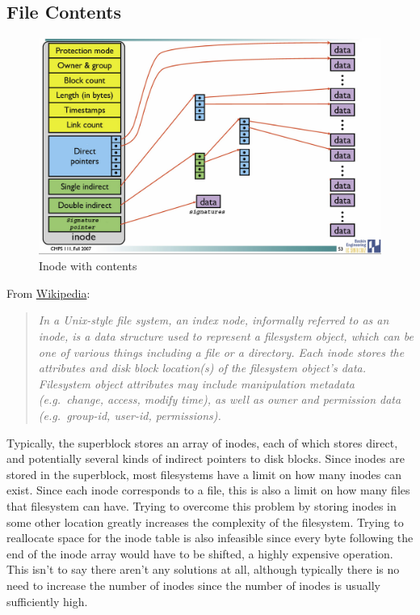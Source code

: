 \subsection{File Contents}

\begin{figure}[htbp]
\centering
\includegraphics[width=.8\textwidth]{filesystems/images/inode_with_signatures.jpg}
\caption{Inode with contents}
\end{figure}

From \href{http://en.wikipedia.org/wiki/Inode}{Wikipedia}:

\begin{quote}
\emph{In a Unix-style file system, an index node, informally referred to as an inode, is a data structure used to represent a filesystem object, which can be one of various things including a file or a directory. Each inode stores the attributes and disk block location(s) of the filesystem object's data. Filesystem object attributes may include manipulation metadata (e.g.~change, access, modify time), as well as owner and permission data (e.g.~group-id, user-id, permissions).}
\end{quote}

Typically, the superblock stores an array of inodes, each of which stores direct, and potentially several kinds of indirect pointers to disk blocks. Since inodes are stored in the superblock, most filesystems have a limit on how many inodes can exist. Since each inode corresponds to a file, this is also a limit on how many files that filesystem can have. Trying to overcome this problem by storing inodes in some other location greatly increases the complexity of the filesystem. Trying to reallocate space for the inode table is also infeasible since every byte following the end of the inode array would have to be shifted, a highly expensive operation. This isn't to say there aren't any solutions at all, although typically there is no need to increase the number of inodes since the number of inodes is usually sufficiently high.

